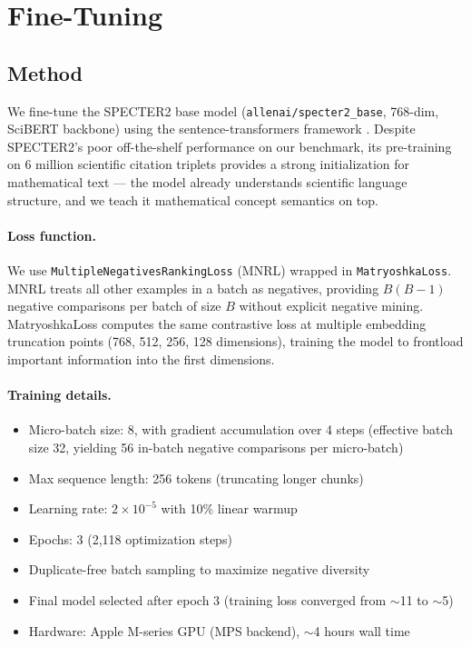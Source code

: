 \documentclass[11pt,a4paper]{article}
\begin{document}
\section{Fine-Tuning}
\label{sec:finetuning}

\subsection{Method}

We fine-tune the SPECTER2 base model (\texttt{allenai/specter2\_base},
768-dim, SciBERT backbone) using the sentence-transformers framework
\cite{sbert}. Despite SPECTER2's poor off-the-shelf performance on our
benchmark, its pre-training on 6 million scientific citation triplets provides
a strong initialization for mathematical text --- the model already understands
scientific language structure, and we teach it mathematical concept semantics
on top.

\paragraph{Loss function.}
We use \texttt{MultipleNegativesRankingLoss} (MNRL) wrapped in
\texttt{MatryoshkaLoss}. MNRL treats all other examples in a batch as
negatives, providing $B(B-1)$ negative comparisons per batch of size $B$
without explicit negative mining. MatryoshkaLoss computes the same contrastive
loss at multiple embedding truncation points (768, 512, 256, 128 dimensions),
training the model to frontload important information into the first
dimensions.

\paragraph{Training details.}
\begin{itemize}[nosep]
    \item Micro-batch size: 8, with gradient accumulation over 4 steps
          (effective batch size 32, yielding 56 in-batch negative comparisons
          per micro-batch)
    \item Max sequence length: 256 tokens (truncating longer chunks)
    \item Learning rate: $2 \times 10^{-5}$ with 10\% linear warmup
    \item Epochs: 3 (2,118 optimization steps)
    \item Duplicate-free batch sampling to maximize negative diversity
    \item Final model selected after epoch 3 (training loss converged
          from $\sim$11 to $\sim$5)
    \item Hardware: Apple M-series GPU (MPS backend), $\sim$4 hours wall time
\end{itemize}
\end{document}
